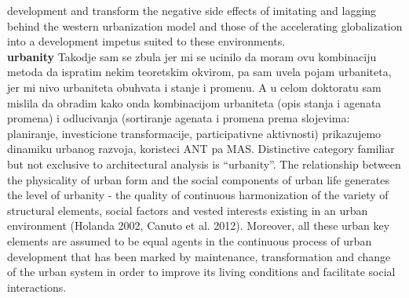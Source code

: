 \documentclass[11pt]{report}
\begin{document}
development and transform the negative side effects of imitating and lagging behind the western urbanization model and those of the accelerating globalization into a development impetus suited to these environments.
\\
\textbf{urbanity}
Takodje sam se zbula jer mi se ucinilo da moram ovu kombinaciju metoda da ispratim nekim teoretskim okvirom, pa sam uvela pojam urbaniteta, jer mi nivo urbaniteta obuhvata i stanje i promenu. A u celom doktoratu sam mislila da obradim kako onda kombinacijom urbaniteta (opis stanja i agenata promena) i odlucivanja (sortiranje agenata i promena prema slojevima: planiranje, investicione transformacije, participativne aktivnosti) prikazujemo dinamiku urbanog razvoja, koristeci  ANT pa MAS. 
Distinctive category familiar but not exclusive to architectural analysis is “urbanity”. The relationship between the physicality of urban form and the social components of urban life generates the level of urbanity - the quality of continuous harmonization of the variety of structural elements, social factors and vested interests existing in an urban environment (Holanda 2002, Canuto et al. 2012). Moreover, all these urban key elements are assumed to be equal agents in the continuous process of urban development that has been marked by maintenance, transformation and change of the urban system in order to improve its living conditions and facilitate social interactions.
\end{document}
